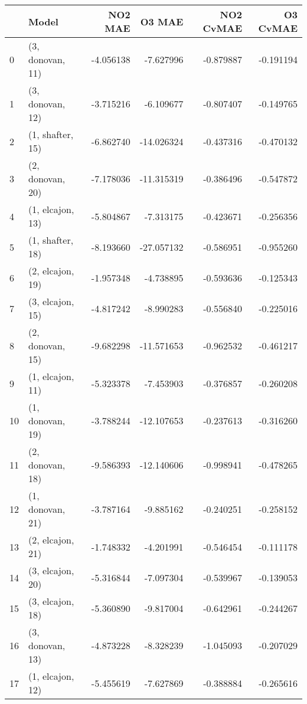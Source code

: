 \begin{tabular}{llrrrr}
\toprule
{} &             Model &   NO2 MAE &     O3 MAE &  NO2 CvMAE &  O3 CvMAE \\
\midrule
0  &  (3, donovan, 11) & -4.056138 &  -7.627996 &  -0.879887 & -0.191194 \\
1  &  (3, donovan, 12) & -3.715216 &  -6.109677 &  -0.807407 & -0.149765 \\
2  &  (1, shafter, 15) & -6.862740 & -14.026324 &  -0.437316 & -0.470132 \\
3  &  (2, donovan, 20) & -7.178036 & -11.315319 &  -0.386496 & -0.547872 \\
4  &  (1, elcajon, 13) & -5.804867 &  -7.313175 &  -0.423671 & -0.256356 \\
5  &  (1, shafter, 18) & -8.193660 & -27.057132 &  -0.586951 & -0.955260 \\
6  &  (2, elcajon, 19) & -1.957348 &  -4.738895 &  -0.593636 & -0.125343 \\
7  &  (3, elcajon, 15) & -4.817242 &  -8.990283 &  -0.556840 & -0.225016 \\
8  &  (2, donovan, 15) & -9.682298 & -11.571653 &  -0.962532 & -0.461217 \\
9  &  (1, elcajon, 11) & -5.323378 &  -7.453903 &  -0.376857 & -0.260208 \\
10 &  (1, donovan, 19) & -3.788244 & -12.107653 &  -0.237613 & -0.316260 \\
11 &  (2, donovan, 18) & -9.586393 & -12.140606 &  -0.998941 & -0.478265 \\
12 &  (1, donovan, 21) & -3.787164 &  -9.885162 &  -0.240251 & -0.258152 \\
13 &  (2, elcajon, 21) & -1.748332 &  -4.201991 &  -0.546454 & -0.111178 \\
14 &  (3, elcajon, 20) & -5.316844 &  -7.097304 &  -0.539967 & -0.139053 \\
15 &  (3, elcajon, 18) & -5.360890 &  -9.817004 &  -0.642961 & -0.244267 \\
16 &  (3, donovan, 13) & -4.873228 &  -8.328239 &  -1.045093 & -0.207029 \\
17 &  (1, elcajon, 12) & -5.455619 &  -7.627869 &  -0.388884 & -0.265616 \\
\bottomrule
\end{tabular}
